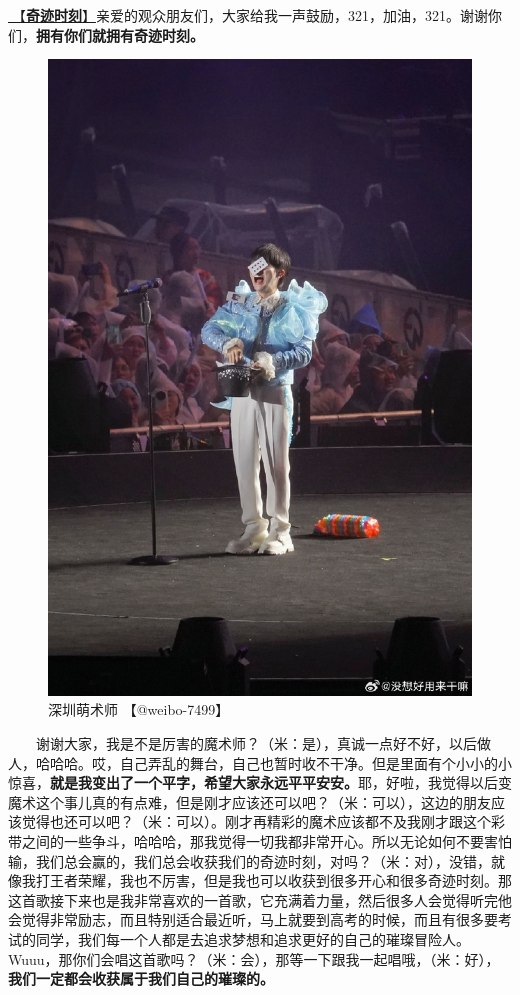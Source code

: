 \documentclass[]{ctexbook}
\begin{document}
\hyperref[magic-moment]{🎵【\textbf{奇迹时刻}】}亲爱的观众朋友们，大家给我一声鼓励，321，加油，321。谢谢你们，\textbf{拥有你们就拥有奇迹时刻。}

\begin{figure}

{\centering \includegraphics[width=400pt]{img/shenzhen20240601/001} 

}

\caption{深圳萌术师 【@weibo-7499】}\label{fig:unnamed-chunk-45}
\end{figure}

  谢谢大家，我是不是厉害的魔术师？（米：是），真诚一点好不好，以后做人，哈哈哈。哎，自己弄乱的舞台，自己也暂时收不干净。但是里面有个小小的小惊喜，\textbf{就是我变出了一个平字，希望大家永远平平安安。}耶，好啦，我觉得以后变魔术这个事儿真的有点难，但是刚才应该还可以吧？（米：可以），这边的朋友应该觉得也还可以吧？（米：可以）。刚才再精彩的魔术应该都不及我刚才跟这个彩带之间的一些争斗，哈哈哈，那我觉得一切我都非常开心。所以无论如何不要害怕输，我们总会赢的，我们总会收获我们的奇迹时刻，对吗？（米：对），没错，就像我打王者荣耀，我也不厉害，但是我也可以收获到很多开心和很多奇迹时刻。那这首歌接下来也是我非常喜欢的一首歌，它充满着力量，然后很多人会觉得听完他会觉得非常励志，而且特别适合最近听，马上就要到高考的时候，而且有很多要考试的同学，我们每一个人都是去追求梦想和追求更好的自己的璀璨冒险人。Wuuu，那你们会唱这首歌吗？（米：会），那等一下跟我一起唱哦，（米：好），\textbf{我们一定都会收获属于我们自己的璀璨的。}
\end{document}
